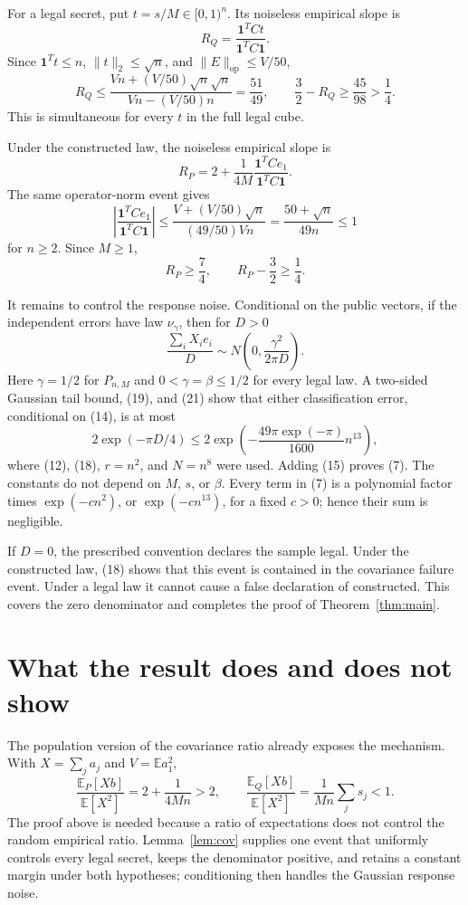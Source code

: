 \documentclass[11pt]{article}
\theoremstyle{remark}
\newcommand{\one}{\mathbf 1}
\newcommand{\E}{\mathbb E}
\begin{document}
For a legal secret, put \(t=s/M\in{[0,1)}^n\).  Its noiseless
empirical slope is
\[
 R_Q=\frac{\one^TCt}{\one^TC\one}.
\]
Since \(\one^Tt\le n\), \(\lVert t\rVert_2\le\sqrt n\), and
\(\lVert E\rVert_{\mathrm{op}}\le V/50\),
\[
 R_Q\le
 \frac{Vn+(V/50)\sqrt n\sqrt n}{Vn-(V/50)n}
 =\frac{51}{49},
 \qquad
 \frac32-R_Q\ge\frac{45}{98}>\frac14.
 \tag{19}
\]
This is simultaneous for every \(t\) in the full legal cube.

Under the constructed law, the noiseless empirical slope is
\[
 R_P=2+\frac1{4M}
 \frac{\one^TCe_1}{\one^TC\one}.
\]
The same operator-norm event gives
\[
 \left|\frac{\one^TCe_1}{\one^TC\one}\right|
 \le\frac{V+(V/50)\sqrt n}{(49/50)Vn}
 =\frac{50+\sqrt n}{49n}\le1
 \tag{20}
\]
for \(n\ge2\).  Since \(M\ge1\),
\[
 R_P\ge\frac74,
 \qquad R_P-\frac32\ge\frac14.
 \tag{21}
\]

It remains to control the response noise.  Conditional on the public
vectors, if the independent errors have law \(\nu_\gamma\), then for
\(D>0\)
\[
 \frac{\sum_iX_ie_i}{D}
 \sim N\!\left(0,\frac{\gamma^2}{2\pi D}\right).
 \tag{22}
\]
Here \(\gamma=1/2\) for \(P_{n,M}\) and
\(0<\gamma=\beta\le1/2\) for every legal law.  A two-sided Gaussian
tail bound, (19), and (21) show that either classification error,
conditional on (14), is at most
\[
 2\exp(-\pi D/4)
 \le2\exp\!\left(
 -\frac{49\pi\exp(-\pi)}{1600}n^{13}\right),
 \tag{23}
\]
where (12), (18), \(r=n^2\), and \(N=n^8\) were used.  Adding
(15) proves (7).  The constants do not depend on \(M\), \(s\), or
\(\beta\).  Every term in (7) is a polynomial factor times
\(\exp(-cn^2)\), or \(\exp(-cn^{13})\), for a fixed \(c>0\);
hence their sum is negligible.

If \(D=0\), the prescribed convention declares the sample legal.  Under
the constructed law, (18) shows that this event is contained in the
covariance failure event.  Under a legal law it cannot cause a false
declaration of constructed.  This covers the zero denominator and
completes the proof of Theorem~\ref{thm:main}.

\section{What the result does and does not show}

The population version of the covariance ratio already exposes the
mechanism.  With \(X=\sum_j a_j\) and \(V=\E a_1^2\),
\[
 \frac{\E_{P}[Xb]}{\E[X^2]}
 =2+\frac1{4Mn}>2,
 \qquad
 \frac{\E_{Q}[Xb]}{\E[X^2]}
 =\frac1{Mn}\sum_js_j<1.
\]
The proof above is needed because a ratio of expectations does not
control the random empirical ratio.  Lemma~\ref{lem:cov} supplies one
event that uniformly controls every legal secret, keeps the denominator
positive, and retains a constant margin under both hypotheses;
conditioning then handles the Gaussian response noise.
\end{document}
